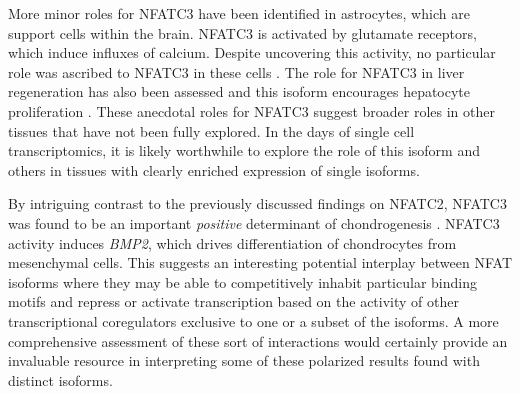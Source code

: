 More minor roles for NFATC3 have been identified in astrocytes, which are support cells within the brain. NFATC3 is activated by glutamate receptors, which induce influxes of calcium. Despite uncovering this activity, no particular role was ascribed to NFATC3 in these cells \citep{Jones2003}. The role for NFATC3 in liver regeneration has also been assessed and this isoform encourages hepatocyte proliferation \citep{Pierre2009}. These anecdotal roles for NFATC3 suggest broader roles in other tissues that have not been fully explored. In the days of single cell transcriptomics, it is likely worthwhile to explore the role of this isoform and others in tissues with clearly enriched expression of single isoforms.

By intriguing contrast to the previously discussed findings on NFATC2, NFATC3 was found to be an important \textit{positive} determinant of chondrogenesis \citep{Ranger2000, Tomita2002}. NFATC3 activity induces \textit{BMP2}, which drives differentiation of chondrocytes from mesenchymal cells. This suggests an interesting potential interplay between NFAT isoforms where they may be able to competitively inhabit particular binding motifs and repress or activate transcription based on the activity of other transcriptional coregulators exclusive to one or a subset of the isoforms. A more comprehensive assessment of these sort of interactions would certainly provide an invaluable resource in interpreting some of these polarized results found with distinct isoforms.

